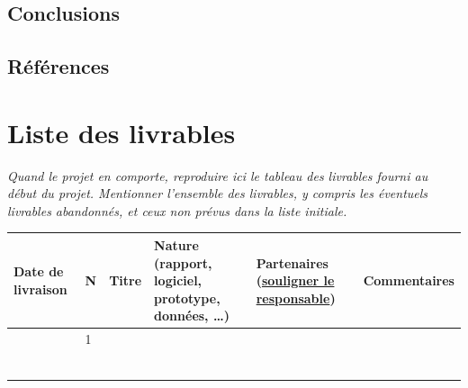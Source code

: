 \documentclass[a4paper,11pt]{article}
\newcommand{\tableheader}[1]{\textbf{\textcolor{ANRbleu}{#1}}}
\newcommand{\instructions}[1]{%
		{%
			\setlength{\parindent}{0cm}%
			{\em\color{ANRvert}#1}%
		}%
	}
\newcommand{\instructions}[1]{}
\begin{document}
\subsection{Conclusions}



\subsection{Références}



\section{Liste des livrables}

\instructions{Quand le projet en comporte, reproduire ici le tableau des livrables fourni au début du projet. Mentionner l'ensemble des livrables, y compris les éventuels livrables abandonnés, et ceux non prévus dans la liste initiale.}



\noindent\begin{longtable}{| p{1.7cm} | p{.5cm} | p{3cm} | p{3cm} | p{3cm} | p{3.5cm} |}
	\hline
	\rowcolor{ANRgrispale}
	\tableheader{Date de livraison} & \tableheader{N\textdegree} & \tableheader{Titre} & \color{ANRbleu}\textbf{Nature} (rapport, logiciel, prototype, données, …) & \color{ANRbleu}\textbf{Partenaires} (\uline{souligner le responsable}) & \tableheader{Commentaires} \\
	\hline
	& 1 & & & & \\
	\hline
	& & & & & \\
	\hline
	& & & & & \\
	\hline
	& & & & & \\
	\hline
	& & & & & \\
	\hline
	& & & & & \\
	\hline
	& & & & & \\
	\hline
\end{longtable}
\end{document}
